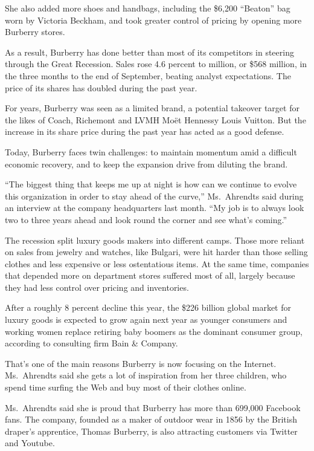 ﻿\documentclass[12pt]{article}
\begin{document}
She also added more shoes and handbags, including the \$6,200 ``Beaton'' bag worn by Victoria
Beckham, and took greater control of pricing by opening more Burberry stores.

As a result, Burberry has done better than most of its competitors in steering through the Great
Recession. Sales rose 4.6 percent to  million, or \$568 million, in the three months
to the end of September, beating analyst expectations. The price of its shares has doubled during
the past year.

For years, Burberry was seen as a limited brand, a potential takeover target for the likes of Coach,
Richemont and LVMH Mo\"et Hennessy Louis Vuitton. But the increase in its share price during the
past year has acted as a good defense.

Today, Burberry faces twin challenges: to maintain momentum amid a difficult economic recovery, and
to keep the expansion drive from diluting the brand.

``The biggest thing that keeps me up at night is how can we continue to evolve this organization in
order to stay ahead of the curve,'' Ms.~Ahrendts said during an interview at the company
headquarters last month. ``My job is to always look two to three years ahead and look round the
corner and see what's coming.''

The recession split luxury goods makers into different camps. Those more reliant on sales from
jewelry and watches, like Bulgari, were hit harder than those selling clothes and less expensive or
less ostentatious items. At the same time, companies that depended more on department stores
suffered most of all, largely because they had less control over pricing and inventories.

After a roughly 8 percent decline this year, the \$226 billion global market for luxury goods is
expected to grow again next year as younger consumers and working women replace retiring baby
boomers as the dominant consumer group, according to consulting firm Bain \& Company.

That's one of the main reasons Burberry is now focusing on the Internet. Ms.~Ahrendts said she gets
a lot of inspiration from her three children, who spend time surfing the Web and buy most of their
clothes online.

Ms.~Ahrendts said she is proud that Burberry has more than 699,000 Facebook fans. The company,
founded as a maker of outdoor wear in 1856 by the British draper's apprentice, Thomas Burberry, is
also attracting customers via Twitter and Youtube.
\end{document}
